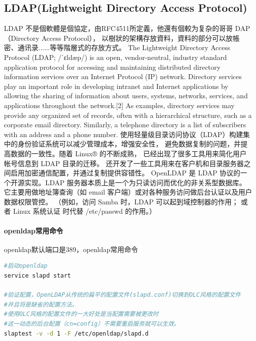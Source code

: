 \documentclass{book}
\begin{document}
\subsection{LDAP(Lightweight Directory Access Protocol)}

LDAP 不是個軟體是個協定，由RFC4511所定義，他還有個較为复杂的哥哥 DAP （Directory Access Protocol），
以樹狀的架構存放資料，資料的部分可以放帳密、通讯录......等等階層式的存放方式。
The Lightweight Directory Access Protocol (LDAP; /ˈɛldæp/) is an open, 
vendor-neutral, industry standard application protocol for accessing and 
maintaining distributed directory information services over an Internet Protocol (IP) network.
Directory services play an important role in developing intranet and Internet applications by allowing the sharing of information about users, 
systems, networks, services, and applications throughout the network.[2] As examples, 
directory services may provide any organized set of records, often with a hierarchical structure, 
such as a corporate email directory. Similarly, a telephone directory is a list of subscribers with an address and a phone number.
使用轻量级目录访问协议（LDAP）构建集中的身份验证系统可以减少管理成本，增强安全性，
避免数据复制的问题，并提高数据的一致性。随着 Linux® 的不断成熟，
已经出现了很多工具用来简化用户帐号信息到 LDAP 目录的迁移。
还开发了一些工具用来在客户机和目录服务器之间启用加密通信配置，并通过复制提供容错性。
OpenLDAP 是 LDAP 协议的一个开源实现。LDAP 服务器本质上是一个为只读访问而优化的非关系型数据库。
它主要用做地址簿查询（如 email 客户端）或对各种服务访问做后台认证以及用户数据权限管控。
（例如，访问 Samba 时，LDAP 可以起到域控制器的作用；
或者 Linux 系统认证 时代替 /etc/passwd 的作用。）

\paragraph{openldap常用命令}openldap默认端口是389，openldap常用命令

\begin{lstlisting}[language=Bash]
#启动openldap
service slapd start

#验证配置，OpenLDAP从传统的扁平的配置文件(slapd.conf)切换到OLC风格的配置文件
#并且将是缺省的配置方法。
#使用OLC风格的配置文件的一大好处是当配置需要被更改时
#这一动态的后台配置（cn=config）不需要重启服务就可以生效。
slaptest -v -d 1 -F /etc/openldap/slapd.d
\end{lstlisting}
\end{document}
